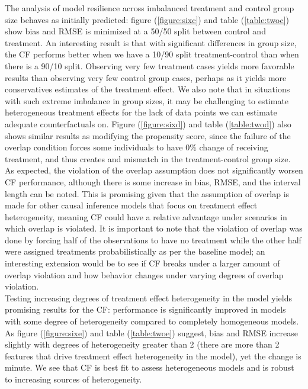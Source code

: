 \documentclass[12pt]{article}
\begin{document}
The analysis of model resilience across imbalanced treatment and control group size behaves as initially predicted: figure (\ref{figure:sixc}) and table (\ref{table:twoc}) show bias and RMSE is minimized at a 50/50 split between control and treatment. An interesting result is that with significant differences in group size, the CF performs better when we have a 10/90 split treatment-control than when there is a 90/10 split. Observing very few treatment cases yields more favorable results than observing very few control group cases, perhaps as it yields more conservatives estimates of the treatment effect. We also note that in situations with such extreme imbalance in group sizes, it may be challenging to estimate heterogeneous treatment effects for the lack of data points we can estimate adequate counterfactuals on. Figure (\ref{figure:sixd}) and table (\ref{table:twod}) also shows similar results as modifying the propensity score, since the failure of the overlap condition forces some individuals to have 0\% change of receiving treatment, and thus creates and mismatch in the treatment-control group size. \\

As expected, the violation of the overlap assumption does not significantly worsen CF performance, although there is some increase in bias, RMSE, and the interval length can be noted. This is promising given that the assumption of overlap is made for other causal inference models that focus on treatment effect heterogeneity, meaning CF could have a relative advantage under scenarios in which overlap is violated. It is important to note that the violation of overlap was done by forcing half of the observations to have no treatment while the other half were assigned treatments probabilistically as per the baseline model; an interesting extension would be to see if CF breaks under a larger amount of overlap violation and how behavior changes under varying degrees of overlap violation.\\ 

Testing increasing degrees of treatment effect heterogeneity in the model yields promising results for the CF:  performance is significantly improved in models with some degree of heterogeneity compared to completely homogeneous models. As figure (\ref{figure:sixe}) and table (\ref{table:twoe}) suggest, bias and RMSE increase slightly with degrees of heterogeneity greater than 2 (there are more than 2 features that drive treatment effect heterogeneity in the model), yet the change is minute. We see that CF is best fit to assess heterogeneous models and is robust to increasing sources of heterogeneity. \\ 
\end{document}
